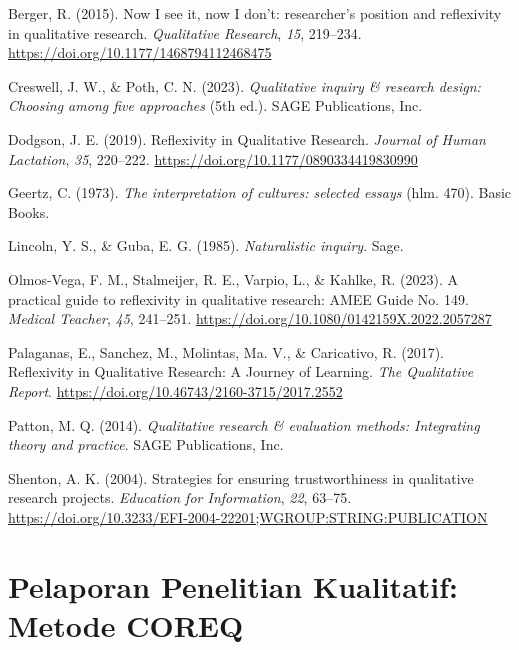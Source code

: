\documentclass[
  indonesian,
  letterpaper,
  DIV=11,
  numbers=noendperiod]{scrreprt}
\newlength{\cslhangindent}
\newenvironment{CSLReferences}[2] %
 {\begin{list}{}{%
  \setlength{\itemindent}{0pt}
  \setlength{\leftmargin}{0pt}
  \setlength{\parsep}{0pt}
  \ifodd #1
   \setlength{\leftmargin}{\cslhangindent}
   \setlength{\itemindent}{-1\cslhangindent}
  \fi
  \setlength{\itemsep}{#2\baselineskip}}}
 {\end{list}}
\begin{document}
\label{refs--20}
\begin{CSLReferences}{1}{0}
Berger, R. (2015). Now I see it, now I don't: researcher's position and
reflexivity in qualitative research. \emph{Qualitative Research},
\emph{15}, 219--234. \url{https://doi.org/10.1177/1468794112468475}

Creswell, J. W., \& Poth, C. N. (2023). \emph{Qualitative inquiry \&
research design: Choosing among five approaches} (5th ed.). SAGE
Publications, Inc.

Dodgson, J. E. (2019). Reflexivity in Qualitative Research.
\emph{Journal of Human Lactation}, \emph{35}, 220--222.
\url{https://doi.org/10.1177/0890334419830990}

Geertz, C. (1973). \emph{The interpretation of cultures: selected
essays} (hlm. 470). Basic Books.

Lincoln, Y. S., \& Guba, E. G. (1985). \emph{Naturalistic inquiry}.
Sage.

Olmos-Vega, F. M., Stalmeijer, R. E., Varpio, L., \& Kahlke, R. (2023).
A practical guide to reflexivity in qualitative research: AMEE Guide No.
149. \emph{Medical Teacher}, \emph{45}, 241--251.
\url{https://doi.org/10.1080/0142159X.2022.2057287}

Palaganas, E., Sanchez, M., Molintas, Ma. V., \& Caricativo, R. (2017).
Reflexivity in Qualitative Research: A Journey of Learning. \emph{The
Qualitative Report}. \url{https://doi.org/10.46743/2160-3715/2017.2552}

Patton, M. Q. (2014). \emph{Qualitative research \& evaluation methods:
Integrating theory and practice}. SAGE Publications, Inc.

Shenton, A. K. (2004). Strategies for ensuring trustworthiness in
qualitative research projects. \emph{Education for Information},
\emph{22}, 63--75.
\url{https://doi.org/10.3233/EFI-2004-22201;WGROUP:STRING:PUBLICATION}

\end{CSLReferences}

\chapter{Pelaporan Penelitian Kualitatif: Metode
COREQ}\label{pelaporan-penelitian-kualitatif-metode-coreq}
\end{document}

